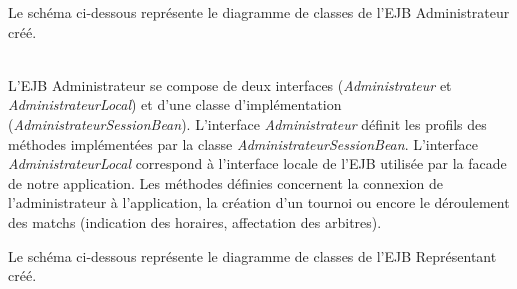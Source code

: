 \documentclass[10pt]{report}
\begin{document}
\newpage
Le schéma ci-dessous représente le diagramme de classes de l'EJB Administrateur créé. \\
	\begin{figure}[hp]
	      \begin{center}
	      \end{center}
	\end{figure}
\\

L'EJB Administrateur se compose de deux interfaces (\textit{Administrateur} et \textit{AdministrateurLocal}) et d'une classe d'implémentation (\textit{AdministrateurSessionBean}). L'interface \textit{Administrateur} définit les profils des méthodes implémentées par la classe \textit{AdministrateurSessionBean}. L'interface \textit{AdministrateurLocal} correspond à l'interface locale de l'EJB utilisée par la facade de notre application. Les méthodes définies concernent la connexion de l'administrateur à l'application, la création d'un tournoi ou encore le déroulement des matchs (indication des horaires, affectation des arbitres).

\newpage
Le schéma ci-dessous représente le diagramme de classes de l'EJB Représentant créé. \\
	\begin{figure}[hp]
	      \begin{center}
	      \end{center}
	\end{figure}
\\
	
\end{document}
